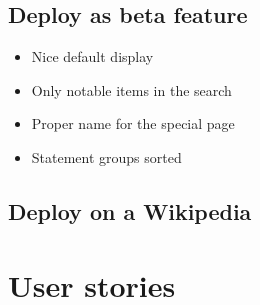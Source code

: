 \documentclass[11pt]{article}
\begin{document}
\subsection[betafeature]{Deploy as beta feature}
\begin{itemize}
\item Nice default display
\item Only notable items in the search
\item Proper name for the special page
\item Statement groups sorted
\end{itemize}

\subsection[deploy]{Deploy on a Wikipedia}

\section{User stories}
\end{document}
